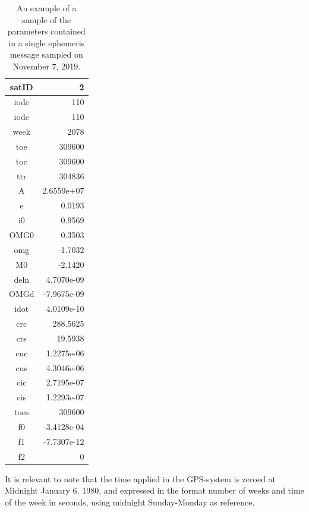 \begin{table}
\begin{center}
\begin{tabular}{|c|r|} \hline
    \bf{ satID} & \bf{2} \\ \hline
    iode & 110 \\
    iodc & 110 \\
    week & 2078 \\
     toe & 309600 \\
     toc & 309600 \\
     ttr & 304836 \\
       A & 2.6559e+07 \\
       e & 0.0193 \\
      i0 & 0.9569 \\
    OMG0 & 0.3503 \\
     omg & -1.7032  \\
      M0 & -2.1420 \\
    deln & 4.7070e-09  \\
    OMGd & -7.9675e-09\\
    idot & 4.0109e-10  \\
     crc & 288.5625 \\
     crs & 19.5938 \\
     cuc & 1.2275e-06 \\
     cus & 4.3046e-06  \\
     cic & 2.7195e-07 \\
     cis & 1.2293e-07 \\
    toes & 309600  \\
      f0 & -3.4128e-04 \\
      f1 & -7.7307e-12 \\
      f2 & 0  \\ \hline
\end{tabular}
\caption{\label{fig:ephData} An example of a sample of the parameters contained in a single ephemeris message sampled on November 7, 2019.}
\end{center}
\end{table}

\par 
It is relevant to note that the time applied in the GPS-system is zeroed at Midnight January 6, 1980, and expressed in the format number of weeks and time of the week in seconds, using midnight Sunday-Monday as reference.

